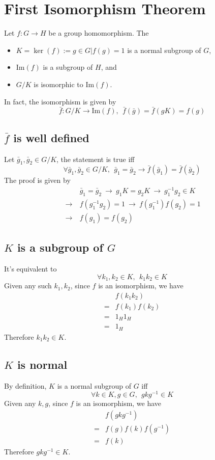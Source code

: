 \documentclass{article}
\renewcommand{\Im}{\text{Im}}
\newcommand{\rightarrows}{\ \rightarrow\ }
\begin{document}
	\section*{First Isomorphism Theorem}
	Let $f:G\rightarrow H$ be a group homomorphism. The
	\begin{itemize}
		\item $K=\ker(f):={g\in G|f(g)=1}$ is a normal subgroup of $G$,
		\item $\Im(f)$ is a subgroup of $H$, and
		\item $G/K$ is isomorphic to $\Im(f)$.
	\end{itemize}
	In fact, the isomorphism is given by$$
		\bar{f}:G/K\rightarrow\Im(f),\ \ \bar{f}(\bar{g})=\bar{f}(gK)=f(g)
	$$
	\subsection*{$\bar{f}$ is well defined}
	Let $\bar{g}_1,\bar{g}_2\in G/K$, the statement is true iff$$
		\forall \bar{g}_1,\bar{g}_2\in G/K,\ \ \bar{g}_1=\bar{g}_2 \rightarrow \bar{f}(\bar{g}_1)=\bar{f}(\bar{g}_2)
	$$
	The proof is given by\begin{align*}
		&\bar{g}_1=\bar{g}_2 \rightarrows g_1K=g_2K \rightarrows g_1^{-1}g_2\in K\\
		\rightarrows& f(g_1^{-1}g_2)=1 \rightarrows f(g_1^{-1})f(g_2)=1\\
		\rightarrows& f(g_1)=f(g_2)
	\end{align*}
	\subsection*{$K$ is a subgroup of $G$}
	It's equivalent to $$
		\forall k_1,k_2\in K,\ \ k_1k_2\in K
	$$
	Given any such $k_1,k_2$, since $f$ is an isomorphism, we have\begin{align*}
		&f(k_1k_2)\\
		=&f(k_1)f(k_2)\\
		=&1_H1_H\\
		=&1_H
	\end{align*}
	Therefore $k_1k_2\in K$.
	\subsection*{$K$ is normal}
	By definition, $K$ is a normal subgroup of $G$ iff $$
		\forall k\in K, g\in G,\ \ gkg^{-1}\in K
	$$
	Given any $k,g$, since $f$ is an isomorphism, we have\begin{align*}
		&f(gkg^{-1})\\
		=&f(g)f(k)f(g^{-1})\\
		=&f(k)
	\end{align*}
	Therefore $gkg^{-1}\in K$.
\end{document}
